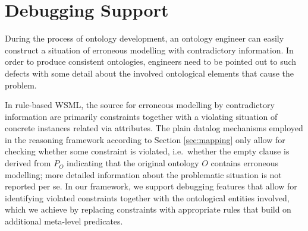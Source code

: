\def\transdebug{\transtxt{debug}}
\def\pvotype{\predicate{\predsubtxt{v\_otype}}}
\def\pvmincard{\predicate{\predsubtxt{v\_mincard}}}
\def\pvmaxcard{\predicate{\predsubtxt{v\_maxcard}}}
\def\pvuser{\predicate{\predsubtxt{v\_user}}}
\def\axiomid{\ensuremath{Ax_{I\!D}}\xspace}
\def\debugaxioms{\ensuremath{P_{\smtxtit{debug}}}\xspace}

\section{Debugging Support\label{sec:debugging}}

During the process of ontology development, an ontology engineer
can easily construct a situation of erroneous modelling with
contradictory information. In order to produce consistent
ontologies, engineers need to be pointed out to such defects with
some detail about the involved ontological elements that cause the
problem.

In rule-based WSML, the source for erroneous modelling by
contradictory information are primarily constraints together with
a violating situation of concrete instances related via
attributes. The plain datalog mechanisms employed in the reasoning
framework according to Section \ref{sec:mapping} only allow for
checking whether some constraint is violated, i.e.\ whether the
empty clause is derived from $P_O$ indicating that the original
ontology $O$ contains erroneous modelling; more detailed
information about the problematic situation is not reported per
se. In our framework, we support debugging features that allow for
identifying violated constraints together with the ontological
entities involved, which we achieve by replacing constraints with
appropriate rules that build on additional meta-level predicates.

